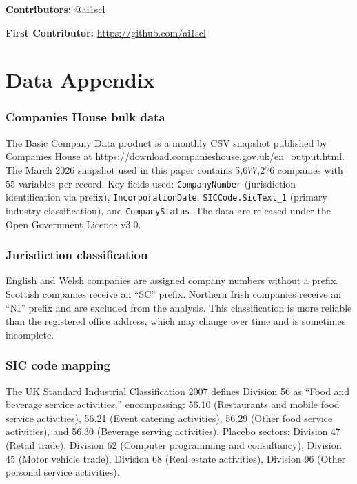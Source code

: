 \documentclass[12pt]{article}
\begin{document}
\noindent\textbf{Contributors:} @ai1scl

\noindent\textbf{First Contributor:} \url{https://github.com/ai1scl}

\label{apep_main_text_end}
\newpage


\newpage
\appendix

\section{Data Appendix}

\subsubsection*{Companies House bulk data} The Basic Company Data product is a monthly CSV snapshot published by Companies House at \url{https://download.companieshouse.gov.uk/en_output.html}. The March 2026 snapshot used in this paper contains 5,677,276 companies with 55 variables per record. Key fields used: \texttt{CompanyNumber} (jurisdiction identification via prefix), \texttt{IncorporationDate}, \texttt{SICCode.SicText\_1} (primary industry classification), and \texttt{CompanyStatus}. The data are released under the Open Government Licence v3.0.

\subsubsection*{Jurisdiction classification} English and Welsh companies are assigned company numbers without a prefix. Scottish companies receive an ``SC'' prefix. Northern Irish companies receive an ``NI'' prefix and are excluded from the analysis. This classification is more reliable than the registered office address, which may change over time and is sometimes incomplete.

\subsubsection*{SIC code mapping} The UK Standard Industrial Classification 2007 defines Division 56 as ``Food and beverage service activities,'' encompassing: 56.10 (Restaurants and mobile food service activities), 56.21 (Event catering activities), 56.29 (Other food service activities), and 56.30 (Beverage serving activities). Placebo sectors: Division 47 (Retail trade), Division 62 (Computer programming and consultancy), Division 45 (Motor vehicle trade), Division 68 (Real estate activities), Division 96 (Other personal service activities).
\end{document}
